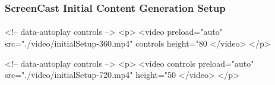 \begin{frame}[fragile,label=ScreenCastInitialContentGenerationSetup]
    \frametitle{ScreenCast Initial Content Generation Setup}
    \framesubtitle{}


\begin{comment}
******  [[elisp:(org-cycle)][| ]]  [[elisp:(blee:ppmm:org-mode-toggle)][Nat]] [[elisp:(beginning-of-buffer)][Top]] [[elisp:(delete-other-windows)][(1)]] || /Video/ =PresArt=  *master-initialSetup.mp4* -- initialSetup ::  [[elisp:(org-cycle)][| ]]
\end{comment}

\begin{presentationMode}
\begin{htmlonly}
  \begin{rawhtml}
      <!-- data-autoplay  controls -->
    <p>
    <video     preload="auto"  src="./video/initialSetup-360.mp4" controls  height="80%
    </video>
    </p>
  \end{rawhtml}
\end{htmlonly}
\end{presentationMode}

\begin{articleMode}
\begin{htmlonly}
  \begin{rawhtml}
      <!-- data-autoplay  controls -->
    <p>
    <video  controls   preload="auto"  src="./video/initialSetup-720.mp4"  height="50%
    </video>
    </p>
  \end{rawhtml}
\end{htmlonly}
\end{articleMode}



\end{frame}



\begin{comment}
*  [[elisp:(org-cycle)][| ]] [[elisp:(org-show-subtree)][|=]] [[elisp:(show-children 10)][|V]] [[elisp:(bx:orgm:indirectBufOther)][|>]] [[elisp:(bx:orgm:indirectBufMain)][|I]] [[elisp:(blee:ppmm:org-mode-toggle)][|N]] [[elisp:(org-top-overview)][|O]] [[elisp:(progn (org-shifttab) (org-content))][|C]] [[elisp:(delete-other-windows)][|1]]  /Section/   ScreenCast VideoJS Setup ::  [[elisp:(org-cycle)][| ]]
\end{comment}

